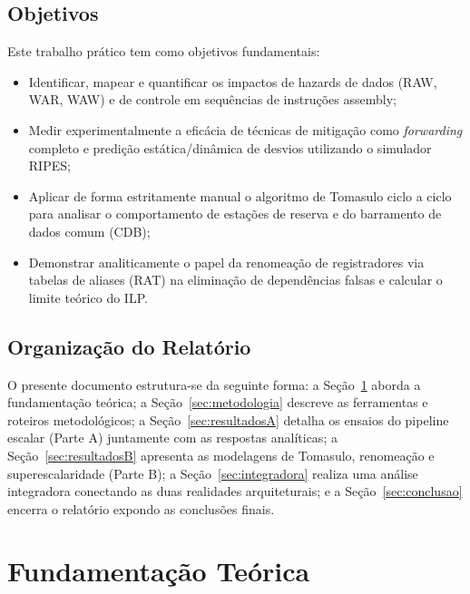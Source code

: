 \documentclass[12pt,a4paper]{article}
\begin{document}
\subsection{Objetivos}
Este trabalho prático tem como objetivos fundamentais:
\begin{itemize}
    \item Identificar, mapear e quantificar os impactos de hazards de dados (RAW, WAR, WAW) e de controle em sequências de instruções assembly;
    \item Medir experimentalmente a eficácia de técnicas de mitigação como \textit{forwarding} completo e predição estática/dinâmica de desvios utilizando o simulador RIPES;
    \item Aplicar de forma estritamente manual o algoritmo de Tomasulo ciclo a ciclo para analisar o comportamento de estações de reserva e do barramento de dados comum (CDB);
    \item Demonstrar analiticamente o papel da renomeação de registradores via tabelas de aliases (RAT) na eliminação de dependências falsas e calcular o limite teórico do ILP.
\end{itemize}

\subsection{Organização do Relatório}
O presente documento estrutura-se da seguinte forma: a Seção~\ref{sec:fundamentacao} aborda a fundamentação teórica; a Seção~\ref{sec:metodologia} descreve as ferramentas e roteiros metodológicos; a Seção~\ref{sec:resultadosA} detalha os ensaios do pipeline escalar (Parte A) juntamente com as respostas analíticas; a Seção~\ref{sec:resultadosB} apresenta as modelagens de Tomasulo, renomeação e superescalaridade (Parte B); a Seção~\ref{sec:integradora} realiza uma análise integradora conectando as duas realidades arquiteturais; e a Seção~\ref{sec:conclusao} encerra o relatório expondo as conclusões finais.
\newpage

\section{Fundamentação Teórica}
\label{sec:fundamentacao}
\end{document}
